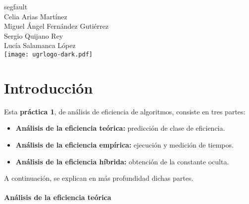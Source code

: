 \documentclass[10pt, a4paper]{article}
\theoremstyle{theorem-style}
\theoremstyle{theorem-style}
\theoremstyle{definition-style}
\theoremstyle{remark-style}
\theoremstyle{example-style}
\theoremstyle{definition-style}
\theoremstyle{remark-style}
\newcommand{\autor}{Celia Arias Martínez\\Miguel Ángel Fernández Gutiérrez\\Sergio Quijano Rey\\Lucía Salamanca López}
\newcommand{\grado}{segfault}
\begin{document}
\begin{titlepage}

  \parbox[t]{\textwidth}{
  	\raggedright %
  	\fontsize{40pt}{40pt}\selectfont\sffamily{}
  }

	\vfill
	
	\parbox[t]{\textwidth}{
		\raggedright %
		\sffamily\large
		\grado\\
		{\Large \autor }\\[15pt]
		\texttt{[image: ugrlogo-dark.pdf]}
	}

\end{titlepage}


\thispagestyle{empty}
\tableofcontents
\newpage


\part{Introducción}

Esta \textbf{práctica 1}, de análisis de eficiencia de algoritmos, consiste en tres partes:

\begin{itemize}
	\item \textbf{Análisis de la eficiencia teórica:} predicción de clase de eficiencia.
	\item \textbf{Análisis de la eficiencia empírica:} ejecución y medición de tiempos.
	\item \textbf{Análisis de la eficiencia híbrida:} obtención de la constante oculta.
\end{itemize}

A continuación, se explican en más profundidad dichas partes.

\subsection*{Análisis de la eficiencia teórica}
\end{document}

